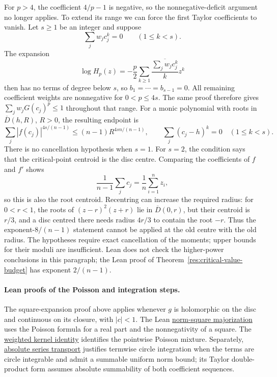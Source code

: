 For $p>4$, the coefficient $4/p-1$ is negative, so the nonnegative-deficit
argument no longer applies. To extend its range we can force the first
Taylor coefficients to vanish. Let $s\ge1$ be an integer and suppose
\[
 \sum_jw_jc_j^k=0\qquad(1\le k<s).
\]
The expansion
\[
 \log H_p(z)=-\frac p2\sum_{k\ge1}
       \frac{\overline{\sum_jw_jc_j^k}}{k}z^k
\]
then has no terms of degree below $s$, so $b_1=\cdots=b_{s-1}=0$. All remaining
coefficient weights are nonnegative for $0<p\le4s$. The same proof
therefore gives $\sum_jw_jG(c_j)^p\le1$ throughout that range.
For a monic polynomial with roots in $\overline D(h,R)$, $R>0$,
the resulting endpoint is
\[
 \sum_j|f(c_j)|^{4s/(n-1)}\le(n-1)R^{4sn/(n-1)},
 \qquad \sum_j(c_j-h)^k=0\quad(1\le k<s).
\]
There is no cancellation hypothesis when $s=1$. For $s=2$, the condition
says that the critical-point centroid is the disc centre. Comparing the
coefficients of $f$ and $f'$ shows
\[
 \frac1{n-1}\sum_jc_j=\frac1n\sum_{i=1}^n z_i,
\]
so this is also the root centroid. Recentring can increase the required
radius: for $0<r<1$, the roots of $(z-r)^2(z+r)$ lie in
$\overline D(0,r)$, but their centroid is $r/3$, and a disc centred
there needs radius $4r/3$ to contain the root $-r$. Thus the
exponent-$8/(n-1)$ statement cannot be applied at the old centre with
the old radius. The hypotheses require exact cancellation of the moments; upper
bounds for their moduli are insufficient. Lean does not check the higher-power conclusions in this
paragraph; the Lean proof of Theorem~\ref{res:critical-value-budget} has
exponent $2/(n-1)$.

\paragraph{Lean proofs of the Poisson and integration steps.}
The square-expansion proof above applies whenever $g$ is holomorphic on
the disc and continuous on its closure, with $|c|<1$. The Lean
\href{https://github.com/wcook04/plectis-erdos/blob/d4fed71423840f70f10edf27b9ad27c22fc4f49a/ErdosProblems/Erdos1041/PoissonNormSquare.lean#L114}{norm-square majorization}
uses the Poisson formula for a real part and the nonnegativity of a square.
The \href{https://github.com/wcook04/plectis-erdos/blob/d4fed71423840f70f10edf27b9ad27c22fc4f49a/ErdosProblems/Erdos1041/PoissonKernelBridge.lean#L27}{weighted kernel identity}
identifies the pointwise Poisson mixture.  Separately,
\href{https://github.com/wcook04/plectis-erdos/blob/d4fed71423840f70f10edf27b9ad27c22fc4f49a/ErdosProblems/Erdos1041/CircleSeriesTransport.lean#L49}{absolute series transport}
justifies termwise circle integration when the terms are circle integrable
and admit a summable uniform norm bound; its Taylor double-product form
assumes absolute summability of both coefficient sequences.

